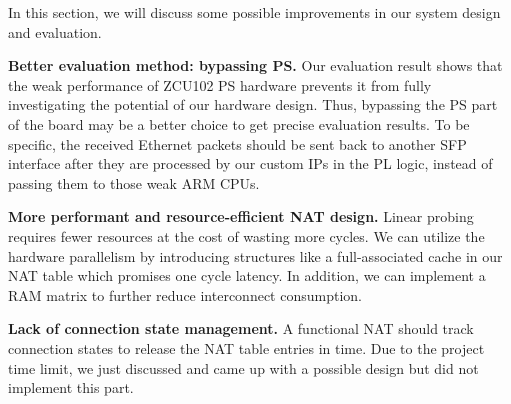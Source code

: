 
In this section, we will discuss some possible improvements in our system design and evaluation.

\textbf{Better evaluation method: bypassing PS.} Our evaluation result shows that the weak performance of ZCU102 PS hardware prevents it from fully investigating the potential of our hardware design. Thus, bypassing the PS part of the board may be a better choice to get precise evaluation results. To be specific, the received Ethernet packets should be sent back to another SFP interface after they are processed by our custom IPs in the PL logic, instead of passing them to those weak ARM CPUs.

\textbf{More performant and resource-efficient NAT design.} Linear probing requires fewer resources at the cost of wasting more cycles. We can utilize the hardware parallelism by introducing structures like a full-associated cache in our NAT table which promises one cycle latency. In addition, we can implement a RAM matrix to further reduce interconnect consumption. 

\textbf{Lack of connection state management.} A functional NAT should track connection states to release the NAT table entries in time. Due to the project time limit, we just discussed and came up with a possible design but did not implement this part. 